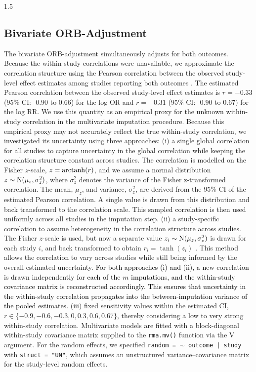 \documentclass{article}
\newcommand{\mycolor}[1]{\textcolor{black}{#1}}
\begin{document}
\begin{spacing}{1.5}
\subsection{Bivariate ORB-Adjustment}
The bivariate ORB-adjustment simultaneously adjusts for both outcomes. Because the within-study correlations were unavailable, we approximate the correlation structure using the Pearson correlation between the observed study-level effect estimates among studies reporting both outcomes \cite{kirkham2012multivariate}. The estimated Pearson correlation between the observed study-level effect estimates is $r = -0.33$ (95\% CI: -0.90 to 0.66) for the log OR and $r = -0.31$ (95\% CI: -0.90 to 0.67) for the log RR. We use this quantity as an empirical proxy for the unknown within-study correlation in the multivariate imputation procedure. Because this empirical proxy may not accurately reflect the true within-study correlation, we investigated its uncertainty using three approaches: (i) a single global correlation for all studies to capture uncertainty in the global correlation while keeping the correlation structure constant across studies. The correlation is modelled on the Fisher $z$-scale, $z = \operatorname{arctanh}(r)$, and we assume a normal distribution $z \sim \operatorname{N}(\mu_z, \sigma_z^2)$, where $\sigma_z^2$ denotes the variance of the Fisher z-transformed correlation. The mean, $\mu_z$, and variance, $\sigma_z^2$, are derived from the 95\% CI of the estimated Pearson correlation. A single value is drawn from this distribution and back transformed to the correlation scale. This sampled correlation is then used uniformly across all studies in the imputation step. (ii) a study-specific correlation to assume heterogeneity in the correlation structure across studies. The Fisher $z$-scale is used, but now a separate value $z_i \sim \operatorname{N}(\mu_z, \sigma_z^2)$ is drawn for each study $i$, and back transformed to obtain $r_i = \tanh(z_i)$ \cite[p. 104]{held2020likelihood}. This method allows the correlation to vary across studies while still being informed by the overall estimated uncertainty.  \mycolor{For both approaches (i) and (ii), a new correlation is drawn independently for each of the $m$ imputations, and the within-study covariance matrix is reconstructed accordingly. This ensures that uncertainty in the within-study correlation propagates into the between-imputation variance of the pooled estimates.} (iii) fixed sensitivity values within the estimated CI, \ie $r \in \{-0.9, -0.6, -0.3, 0, 0.3, 0.6, 0.67\}$, thereby considering a low to very strong within-study correlation.
Multivariate models are fitted with a block-diagonal within-study covariance matrix supplied to the \texttt{rma.mv()} function via the V argument. For the random effects, we specified \texttt{random = $ \sim$ outcome | study} with \texttt{struct = "UN"}, which assumes an unstructured variance–covariance matrix for the study-level random effects.



\end{spacing}
\end{document}
